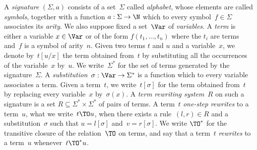\documentclass{LMCS}
\begin{document}
A \emph{signature} $(\Sigma,a)$ consists of a set~$\Sigma$ called
\emph{alphabet}, whose elements are called \emph{symbols}, together with a
function $a:\Sigma\to\N$ which to every symbol~$f\in\Sigma$ associates its
\emph{arity}. We also suppose fixed a set~$\Var$ of \emph{variables}. A
\emph{term} is either a variable $x\in\Var$ or of the form $f(t_1,\ldots,t_n)$
where the $t_i$ are terms and~$f$ is a symbol of arity~$n$. Given two terms $t$
and $u$ and a variable~$x$, we denote by~$t[u/x]$ the term obtained from~$t$ by
substituting all the occurrences of the variable~$x$ by~$u$. We write~$\Sigma^*$
for the set of terms generated by the signature~$\Sigma$. A
\emph{substitution}~$\sigma:\Var\to\Sigma^*$ is a function which to every
variable associates a term. Given a term~$t$, we write~$t[\sigma]$ for the term
obtained from~$t$ by replacing every variable~$x$ by~$\sigma(x)$. A \emph{term
  rewriting system}~$R$ on such a signature is a set
$R\subseteq\Sigma^*\times\Sigma^*$ of pairs of terms. A term~$t$ \emph{one-step
  rewrites} to a term~$u$, what we write~$t\TO u$, when there exists a
rule~$(l,r)\in R$ and a substitution~$\sigma$ such that $u=l[\sigma]$
and~$v=r[\sigma]$. We write $\TO^*$ for the transitive closure of the
relation~$\TO$ on terms, and say that a term~$t$ \emph{rewrites} to a term~$u$
whenever~$t\TO^*u$.
\end{document}
